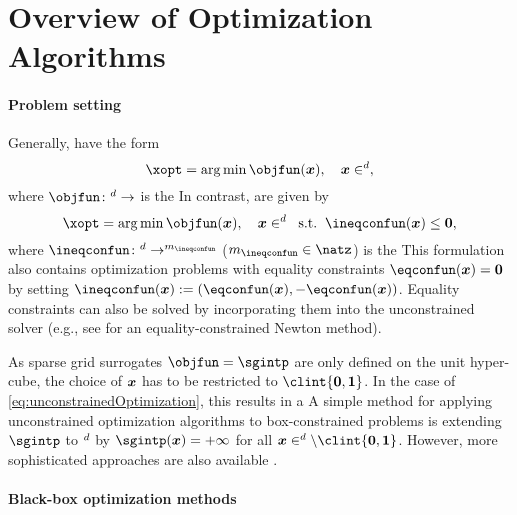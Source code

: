 \section{Overview of Optimization Algorithms}
\label{sec:51algorithms}

\paragraph{Problem setting}

Generally,  have the form
\begin{equation}
  \label{eq:unconstrainedOptimization}
  \xopt = \argmin \objfun(\*x),\quad
  \*x \in \real^d,
\end{equation}
where $\objfun\colon \real^d \to \real$ is the 
In contrast,  are given by
\begin{equation}
  \label{eq:constrainedOptimization}
  \xopt = \argmin \objfun(\*x),\quad
  \*x \in \real^d\;\;\text{s.t.}\;\;
  \ineqconfun(\*x) \le \*0,
\end{equation}
where
$\ineqconfun\colon \real^d \to \real^{m_{\ineqconfun}}$
($m_{\ineqconfun} \in \natz$)
is the 
This formulation also contains optimization problems
with equality constraints $\eqconfun(\*x) = \*0$
by setting $\ineqconfun(\*x) := (\eqconfun(\*x), -\eqconfun(\*x))$.
Equality constraints can also be solved by incorporating them
into the unconstrained solver (e.g., see \cite{Boyd04Convex}
for an equality-constrained Newton method).

As sparse grid surrogates $\objfun = \sgintp$ are only defined on the
unit hyper-cube,
the choice of ${\boldsymbol{x}}$ has to be restricted to $\clint{\*0, \*1}$.
In the case of \eqref{eq:unconstrainedOptimization},
this results in a 
A simple method for applying unconstrained optimization algorithms
to box-constrained problems is extending $\sgintp$ to $\real^d$ by
$\sgintp(\*x) = +\infty$ for all $\*x \in \real^d \setminus \clint{\*0, \*1}$.
However, more sophisticated
approaches are also available \cite{More87Optimization}.

\paragraph{Black-box optimization methods}

